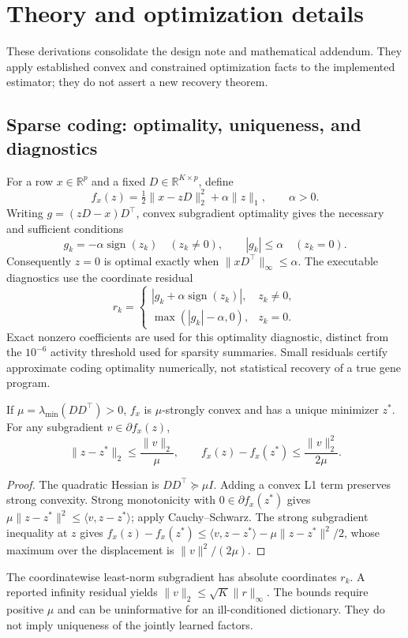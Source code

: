 \section{Theory and optimization details}\label{app:theory}
These derivations consolidate the design note and mathematical addendum.
They apply established convex and constrained optimization facts to the
implemented estimator; they do not assert a new recovery theorem.
\subsection{Sparse coding: optimality, uniqueness, and diagnostics}
For a row $x\in\mathbb R^p$ and a fixed $D\in\mathbb R^{K\times p}$, define
\[
 f_x(z)=\tfrac12\|x-zD\|_2^2+\alpha\|z\|_1,\qquad \alpha>0.
\]
Writing $g=(zD-x)D^\top$, convex subgradient optimality gives the necessary and sufficient conditions
\[
 g_k=-\alpha\operatorname{sign}(z_k)\quad(z_k\ne0),\qquad
 |g_k|\le\alpha\quad(z_k=0).
\]
Consequently $z=0$ is optimal exactly when $\|xD^\top\|_\infty\le\alpha$. The executable diagnostics use the coordinate residual
\[
 r_k=\begin{cases}|g_k+\alpha\operatorname{sign}(z_k)|,&z_k\ne0,\\
 \max(|g_k|-\alpha,0),&z_k=0.
 \end{cases}
\]
Exact nonzero coefficients are used for this optimality diagnostic, distinct from the $10^{-6}$ activity threshold used for sparsity summaries. Small residuals certify approximate coding optimality numerically, not statistical recovery of a true gene program.

\begin{proposition}
If $\mu=\lambda_{\min}(DD^\top)>0$, $f_x$ is $\mu$-strongly convex and has a unique minimizer $z^*$. For any subgradient $v\in\partial f_x(z)$,
\[
 \|z-z^*\|_2\le\frac{\|v\|_2}{\mu},\qquad
 f_x(z)-f_x(z^*)\le\frac{\|v\|_2^2}{2\mu}.
\]
\end{proposition}
\begin{proof}
The quadratic Hessian is $DD^\top\succeq\mu I$. Adding a convex L1 term preserves strong convexity. Strong monotonicity with $0\in\partial f_x(z^*)$ gives
$\mu\|z-z^*\|^2\le\langle v,z-z^*\rangle$; apply Cauchy--Schwarz. The strong subgradient inequality at $z$ gives
$f_x(z)-f_x(z^*)\le\langle v,z-z^*\rangle-\mu\|z-z^*\|^2/2$, whose maximum over the displacement is $\|v\|^2/(2\mu)$.
\end{proof}
The coordinatewise least-norm subgradient has absolute coordinates $r_k$. A reported infinity residual yields $\|v\|_2\le\sqrt K\|r\|_\infty$. The bounds require positive $\mu$ and can be uninformative for an ill-conditioned dictionary. They do not imply uniqueness of the jointly learned factors.

